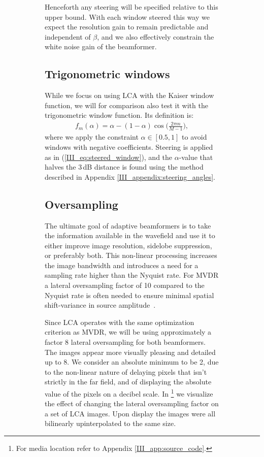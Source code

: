 \begin{figure}[tbp]
\begin{figure}[tbp]
\begin{figure*}[t]
\begin{figure*}[tbp]
\begin{figure*}[tb]
Henceforth any steering will be specified relative to this upper bound. With each window steered this way we expect the resolution gain to remain predictable and independent of $\beta$, and we also effectively constrain the white noise gain of the beamformer.

\subsection{Trigonometric windows}\label{III_sec:lca_trigonometric}

While we focus on using LCA with the Kaiser window function, we will for comparison also test it with the trigonometric window function. Its definition is:
%
\begin{align}
f_m(\alpha) = \alpha - (1-\alpha)\cos\Big(\frac{2\pi m}{M-1}\Big),\label{III_eq:trig_window_function}
\end{align}
%
where we apply the constraint $\alpha\in[0.5,1]$ to avoid windows with negative coefficients. Steering is applied as in (\ref{III_eq:steered_window}), and the $\alpha$-value that halves the \minus{}3\,dB distance is found using the method described in Appendix \ref{III_appendix:steering_angles}. 


\subsection{Oversampling}\label{III_sec:lca_oversampling}

The ultimate goal of adaptive beamformers is to take the information available in the wavefield and use it to either improve image resolution, sidelobe suppression, or preferably both. This non-linear processing increases the image bandwidth and introduces a need for a sampling rate higher than the Nyquist rate. For MVDR a lateral oversampling factor of 10 compared to the Nyquist rate is often needed to ensure minimal spatial shift-variance in source amplitude~\cite{Asen2014}.

Since LCA operates with the same optimization criterion as MVDR, we will be using approximately a factor 8 lateral oversampling for both beamformers. The images appear more visually pleasing and detailed up to 8. We consider an absolute minimum to be 2, due to the non-linear nature of delaying pixels that isn't strictly in the far field, and of displaying the absolute value of the pixels on a decibel scale. In \mediaI{}\footnote{For media location refer to Appendix \ref{III_app:source_code}.} we visualize the effect of changing the lateral oversampling factor on a set of LCA images. Upon display the images were all bilinearly upinterpolated to the same size. 



\end{figure*}
\end{figure*}
\end{figure*}
\end{figure}
\end{figure}
